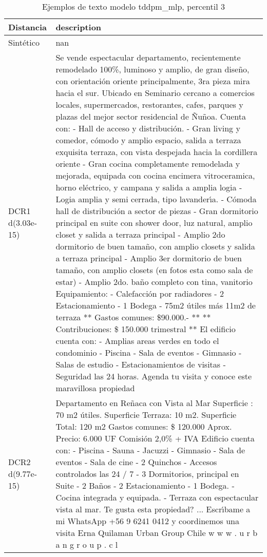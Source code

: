 \begin{table}[H]
\centering
\fontsize{10}{14}\selectfont
\caption{Ejemplos de texto modelo tddpm\_mlp, percentil 3}
\label{table-example-economicos-b-3-tddpm_mlp-3p-text}
\begin{tabular}{|l|m{35em}|}
\hline
\rowcolor[gray]{0.8}
Distancia & description \\
\hline Sintético & nan \\
\hline DCR1 d(3.03e-15) & Se vende espectacular departamento, recientemente remodelado 100\%, luminoso y amplio, de gran dise\~no, con orientaci\'on oriente principalmente, 3ra pieza mira hacia el sur. Ubicado en Seminario cercano a comercios locales, supermercados, restorantes, cafes, parques y plazas del mejor sector residencial de \~Nu\~noa.  Cuenta con: - Hall de acceso y distribuci\'on. - Gran living y comedor, c\'omodo y amplio espacio, salida a terraza exquisita terraza, con vista despejada hacia la cordillera oriente - Gran cocina completamente remodelada y mejorada, equipada con cocina encimera vitroceramica, horno el\'ectrico, y campana y salida a amplia logia - Logia amplia y semi cerrada, tipo lavander{\'\i}a. - C\'omoda hall de distribuci\'on a sector de piezas - Gran dormitorio principal en suite con shower door, luz natural, amplio closet y salida a terraza principal - Amplio 2do dormitorio de buen tama\~no, con amplio closets y salida a terraza principal - Amplio 3er dormitorio de buen tama\~no, con amplio closets (en fotos esta como sala de estar)
 - Amplio 2do. ba\~no completo con tina, vanitorio   Equipamiento: - Calefacci\'on por radiadores - 2 Estacionamiento - 1 Bodega - 75m2 \'utiles m\'as 11m2 de terraza    ** Gastos comunes: \$90.000.- ** ** Contribuciones: \$ 150.000 trimestral **  El edificio cuenta con: - Amplias areas verdes en todo el condominio - Piscina - Sala de eventos - Gimnasio - Salas de estudio  - Estacionamientos de visitas - Seguridad las 24 horas.  Agenda tu visita y conoce este maravillosa propiedad \\
\hline DCR2 d(9.77e-15) & Departamento en Re\~naca con Vista al Mar   Superficie : 70 m2 \'utiles. Superficie Terraza: 10 m2. Superficie Total: 120 m2  Gastos comunes: \$ 120.000 Aprox.  Precio: 6.000 UF  Comisi\'on 2,0\% + IVA  Edificio cuenta con: - Piscina  - Sauna - Jacuzzi - Gimnasio  - Sala de eventos  - Sala de cine  - 2 Quinchos  - Accesos controlados las 24 / 7  - 3 Dormitorios, principal en Suite - 2 Ba\~nos  - 2 Estacionamiento - 1 Bodega. - Cocina integrada y equipada.  - Terraza con espectacular vista al mar.  Te gusta esta propiedad? ... Escr{\'\i}bame a mi WhatsApp +56 9 6241 0412 y coordinemos una visita  Erna Quilaman Urban Group Chile w w w . u r b a n g r o u p . c l \\
\hline
\end{tabular}
\end{table}
